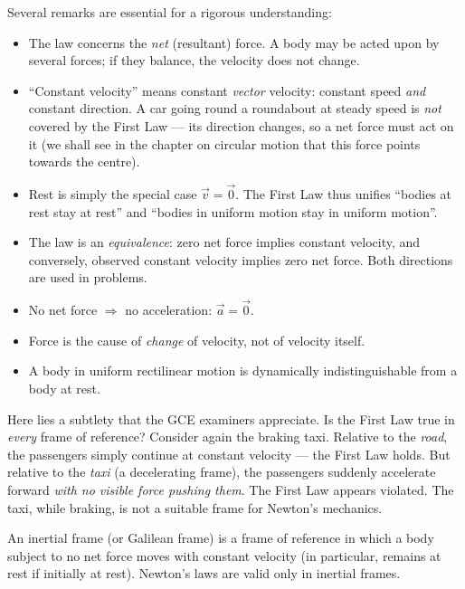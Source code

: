 \documentclass[11pt]{article}
\newcommand{\cle}[1]{{\popxbold\color{popdark}#1}}
\newcounter{popsec}
\newcounter{popsub}
\newcommand{\courssub}[1]{%
  \stepcounter{popsub}%
  \par\vspace{9pt}\noindent{\popxbold\fontsize{11.5}{13}\selectfont\color{popink}{\color{poporange}\thepopsec.\thepopsub}\hspace{6pt}#1}\par\nopagebreak\vspace{4pt}
}
\begin{document}
Several remarks are essential for a rigorous understanding:

\begin{itemize}
\item The law concerns the \emph{net} (resultant) force. A body may be acted upon by several forces; if they balance, the velocity does not change.
\item ``Constant velocity'' means constant \emph{vector} velocity: constant speed \emph{and} constant direction. A car going round a roundabout at steady speed is \emph{not} covered by the First Law — its direction changes, so a net force must act on it (we shall see in the chapter on circular motion that this force points towards the centre).
\item Rest is simply the special case $\vec{v}=\vec{0}$. The First Law thus unifies ``bodies at rest stay at rest'' and ``bodies in uniform motion stay in uniform motion''.
\item The law is an \emph{equivalence}: zero net force implies constant velocity, and conversely, observed constant velocity implies zero net force. Both directions are used in problems.
\end{itemize}

\begin{aretenir}
\begin{itemize}
\item No net force $\Rightarrow$ no acceleration: $\vec{a}=\vec{0}$.
\item Force is the cause of \emph{change} of velocity, not of velocity itself.
\item A body in uniform rectilinear motion is dynamically indistinguishable from a body at rest.
\end{itemize}
\end{aretenir}

\courssub{Inertial reference frames}

Here lies a subtlety that the GCE examiners appreciate. Is the First Law true in \emph{every} frame of reference? Consider again the braking taxi. Relative to the \emph{road}, the passengers simply continue at constant velocity — the First Law holds. But relative to the \emph{taxi} (a decelerating frame), the passengers suddenly accelerate forward \emph{with no visible force pushing them}. The First Law appears violated. The taxi, while braking, is not a suitable frame for Newton's mechanics.

\begin{definition}
An \cle{inertial frame} (or Galilean frame) is a frame of reference in which a body subject to no net force moves with constant velocity (in particular, remains at rest if initially at rest). Newton's laws are valid only in inertial frames.
\end{definition}
\end{document}
